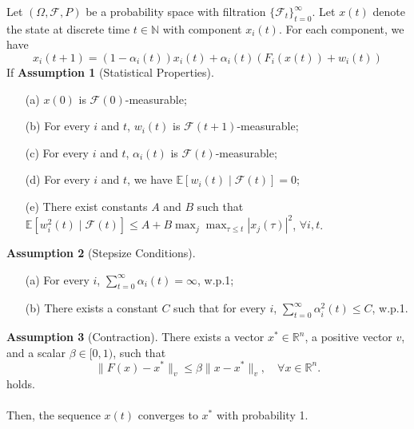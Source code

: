 \begin{theorem}
Let $(\Omega, \mathcal{F},P)$ be a probability space with filtration $\{\mathcal{F}_t\}_{t=0}^\infty$. Let $x(t)$ denote the state at discrete time $t\in\mathbb{N}$ with component $x_i(t)$. For each component, we have
$$
x_i(t+1) = (1-\alpha_i(t))x_i(t) + \alpha_i(t)(F_i(x(t)) + w_i(t)) 
$$
If \textbf{Assumption 1} (Statistical Properties).
\begin{enumerate}
\item[(a)] $x(0)$ is $\mathcal{F}(0)$-measurable;
\item[(b)] For every $i$ and $t$, $w_i(t)$ is $\mathcal{F}(t+1)$-measurable;
\item[(c)] For every $i$ and $t$, $\alpha_i(t)$ is $\mathcal{F}(t)$-measurable;
\item[(d)] For every $i$ and $t$, we have $\mathbb{E}[w_i(t) \mid \mathcal{F}(t)] = 0$;
\item[(e)] There exist constants $A$ and $B$ such that
$\mathbb{E}[w_i^2(t) \mid \mathcal{F}(t)] \leq A + B \max_j \max_{\tau \leq t} |x_j(\tau)|^2$, $\forall i, t$.
\end{enumerate}

\vspace{1em}

\noindent
\textbf{Assumption 2} (Stepsize Conditions).
\begin{enumerate}
\item[(a)] For every $i$, $\sum_{t=0}^{\infty} \alpha_i(t) = \infty$, w.p.1;
\item[(b)] There exists a constant $C$ such that for every $i$, $\sum_{t=0}^{\infty} \alpha_i^2(t) \leq C$, w.p.1.
\end{enumerate}
\vspace{1em}

\noindent
\textbf{Assumption 3} (Contraction).
There exists a vector $x^* \in \mathbb{R}^n$, a positive vector $v$, and a scalar $\beta \in [0,1)$, such that
\begin{equation}
\|F(x) - x^*\|_v \leq \beta \|x - x^*\|_v, \quad \forall x \in \mathbb{R}^n.
\end{equation} holds.\\
\\
\noindent Then, the sequence $x(t)$ converges to $x^*$ with probability 1.
\end{theorem}
